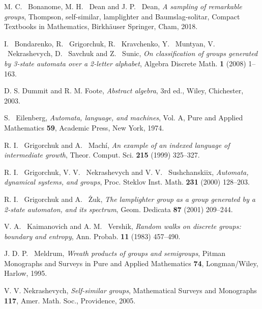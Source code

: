 \documentclass[mat1]{fmfdeloTS2.0}
\begin{document}
\bigskip
\begin{thebibliography}{99}

%
%
%

 M. C. ~Bonanome, M. H. ~Dean and J. P. ~Dean, \emph{A sampling of remarkable groups}, Thompson, self-similar, lamplighter and Baumslag-solitar, Compact Textbooks in Mathematics, Birkhäuser Springer, Cham, 2018.

 I. ~Bondarenko, R. ~Grigorchuk, R. ~Kravchenko, Y. ~Muntyan, V. ~Nekrashevych, D. ~Savchuk and Z. ~Sunic, \emph{On classification of groups generated by 3-state automata over a 2-letter alphabet}, Algebra Discrete Math. \textbf{1} (2008) 1--163.

 D. S. Dummit and R. M. Foote, \textit{Abstract algebra}, 3rd ed., Wiley, Chichester, 2003.

 S. ~Eilenberg, \emph{Automata, language, and machines}, Vol. A, Pure and Applied Mathematics \textbf{59}, Academic Press, New York, 1974.

 R. I. ~Grigorchuk and A. ~Machí, \textit{An example of an indexed language of intermediate growth}, Theor. Comput. Sci. \textbf{215} (1999) 325--327.

 R. I. ~Grigorchuk, V. V. ~Nekrashevych and V. V. ~Sushchanskiix, \emph{Automata, dynamical systems, and groups}, Proc. Steklov Inst. Math. \textbf{231} (2000) 128--203.

 R. I. ~Grigorchuk and A. ~Żuk, \textit{The lamplighter group as a group generated by a 2-state automaton, and its spectrum}, Geom. Dedicata \textbf{87} (2001) 209--244.

 V. A. ~Kaimanovich and A. M. ~Vershik, \emph{Random walks on discrete groups: boundary and entropy}, Ann. Probab. \textbf{11} (1983) 457--490.

 J. D. P. ~Meldrum, \emph{Wreath products of groups and semigroups}, Pitman Monographs and Surveys in Pure and Applied Mathematics \textbf{74}, Longman/Wiley, Harlow, 1995.

 V. V. Nekrashevych, \emph{Self-similar groups}, Mathematical Surveys and Monographs \textbf{117}, Amer. Math. Soc., Providence, 2005.


\end{thebibliography}
\end{document}
